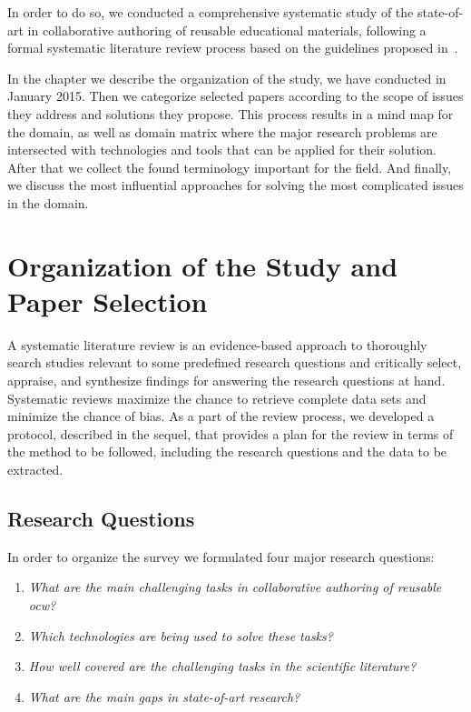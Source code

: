 \documentclass[PhD, Submit, ngerman,UKenglish,table]{scrbook}
\begin{document}
In order to do so, we conducted a comprehensive systematic study of the state-of-art in collaborative authoring of reusable educational materials, 
following a formal systematic literature review process based on the guidelines proposed in~\cite{Dyba2007, Kitchenham2004}.

In the chapter we describe the organization of the study, we have conducted in January 2015. 
Then we categorize selected papers according to the scope of issues they address and solutions they propose. 
This process results in a mind map for the domain, as well as domain matrix where the major research problems are intersected with technologies and tools that can be applied for their solution.
After that we collect the found terminology important for the field.
And finally, we discuss the most influential approaches for solving the most complicated issues in the domain.



\section{Organization of the Study and Paper Selection}
\label{section:collecting_studies}


A systematic literature review is an evidence-based approach to thoroughly search studies relevant to some predefined research questions and critically select, appraise, and synthesize findings for answering the research questions at hand.
Systematic reviews maximize the chance to retrieve complete data sets and minimize the chance of bias.
As a part of the review process, we developed a protocol,  described in the sequel, that provides a plan for the review in terms of the method to be followed, including the research questions and the data to be extracted.

\subsection{Research Questions}
\label{sec:researchQuestion}

In order to organize the survey we formulated four major research questions:
\begin{enumerate}

\item \emph{What are the main challenging tasks in collaborative authoring of reusable \gls{ocw}?}
\item \emph{Which technologies are being used to solve these tasks?}
\item \emph{How well covered are the challenging tasks in the scientific literature?}
\item \emph{What are the main gaps in state-of-art research?}

\end{enumerate}
\end{document}
